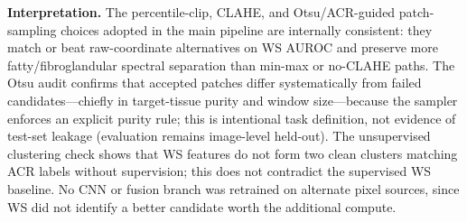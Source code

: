 \textbf{Interpretation.} The percentile-clip, CLAHE, and Otsu/ACR-guided patch-sampling choices adopted in the main pipeline are internally consistent: they match or beat raw-coordinate alternatives on WS AUROC and preserve more fatty/fibroglandular spectral separation than min-max or no-CLAHE paths. The Otsu audit confirms that accepted patches differ systematically from failed candidates---chiefly in target-tissue purity and window size---because the sampler enforces an explicit purity rule; this is intentional task definition, not evidence of test-set leakage (evaluation remains image-level held-out). The unsupervised clustering check shows that WS features do not form two clean clusters matching ACR labels without supervision; this does not contradict the supervised WS baseline. No CNN or fusion branch was retrained on alternate pixel sources, since WS did not identify a better candidate worth the additional compute.
